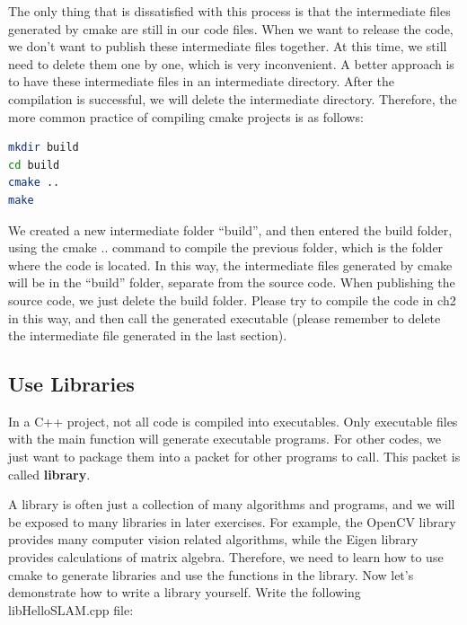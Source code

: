 The only thing that is dissatisfied with this process is that the intermediate files generated by cmake are still in our code files. When we want to release the code, we don't want to publish these intermediate files together. At this time, we still need to delete them one by one, which is very inconvenient. A better approach is to have these intermediate files in an intermediate directory. After the compilation is successful, we will delete the intermediate directory. Therefore, the more common practice of compiling cmake projects is as follows:
\begin{lstlisting}[language=sh,caption=Terminal input]
mkdir build
cd build
cmake ..
make
\end{lstlisting}
We created a new intermediate folder ``build'', and then entered the build folder, using the cmake .. command to compile the previous folder, which is the folder where the code is located. In this way, the intermediate files generated by cmake will be in the ``build'' folder, separate from the source code. When publishing the source code, we just delete the build folder. Please try to compile the code in ch2 in this way, and then call the generated executable (please remember to delete the intermediate file generated in the last section).

\subsection{Use Libraries}
In a C++ project, not all code is compiled into executables. Only executable files with the main function will generate executable programs. For other codes, we just want to package them into a packet for other programs to call. This packet is called \textbf{library}.

A library is often just a collection of many algorithms and programs, and we will be exposed to many libraries in later exercises. For example, the OpenCV library provides many computer vision related algorithms, while the Eigen library provides calculations of matrix algebra. Therefore, we need to learn how to use cmake to generate libraries and use the functions in the library. Now let's demonstrate how to write a library yourself. Write the following libHelloSLAM.cpp file:

